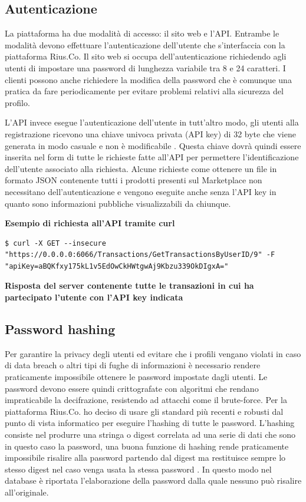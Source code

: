 \subsection{Autenticazione}
La piattaforma ha due modalità di accesso: il sito web e l'API. Entrambe le modalità devono effettuare l'autenticazione dell'utente che s'interfaccia con la piattaforma Rius.Co. Il sito web si occupa dell'autenticazione richiedendo agli utenti di impostare una password di lunghezza variabile tra 8 e 24 caratteri. I clienti possono anche richiedere la modifica della password che è comunque una pratica da fare periodicamente per evitare problemi relativi alla sicurezza del profilo. 
\medskip

L'API invece esegue l'autenticazione dell'utente in tutt'altro modo, gli utenti alla registrazione ricevono una chiave univoca privata (API key) di 32 byte che viene generata in modo casuale e non è modificabile \cite{APIKEY}. Questa chiave dovrà quindi essere inserita nel form di tutte le richieste fatte all'API per permettere l'identificazione dell'utente associato alla richiesta. Alcune richieste come ottenere un file in formato JSON contenente tutti i prodotti presenti sul Marketplace non necessitano dell'autenticazione e vengono eseguite anche senza l'API key in quanto sono informazioni pubbliche visualizzabili da chiunque. 
\bigskip

\textbf{Esempio di richiesta all'API tramite curl}
\begin{lstlisting}[style=dos]
$ curl -X GET --insecure "https://0.0.0.0:6066/Transactions/GetTransactionsByUserID/9" -F  "apiKey=aBQKfxy175kL1v5EdOwCkHWtgwAj9Kbzu339OkDIgxA="
\end{lstlisting}
\bigskip

\textbf{Risposta del server contenente tutte le transazioni in cui ha partecipato l'utente con l'API key indicata} 

\subsection{Password hashing} 
Per garantire la privacy degli utenti ed evitare che i profili vengano violati in caso di data breach o altri tipi di fughe di informazioni è necessario rendere praticamente impossibile ottenere le password impostate dagli utenti. Le password devono essere quindi crittografate con algoritmi che rendano impraticabile la decifrazione, resistendo ad attacchi come il brute-force. Per la piattaforma Rius.Co. ho deciso di usare gli standard più recenti e robusti dal punto di vista informatico per eseguire l'hashing di tutte le password. L'hashing consiste nel produrre una stringa o digest correlata ad una serie di dati che sono in questo caso la password, una buona funzione di hashing rende praticamente impossibile risalire alla password partendo dal digest ma restituisce sempre lo stesso digest nel caso venga usata la stessa password \cite{Hashing}. In questo modo nel database è riportata l'elaborazione della password dalla quale nessuno può risalire all'originale.
\medskip

